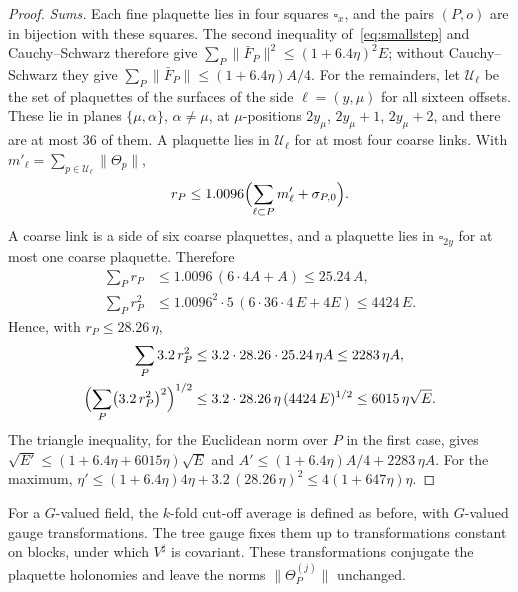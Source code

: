 \documentclass[11pt]{amsart}
\theoremstyle{definition}
\theoremstyle{remark}
\numberwithin{equation}{section}
\begin{document}
\begin{proof}
\emph{Sums.} Each fine plaquette lies in four squares $\square_x$, and the
pairs $(P,o)$ are in bijection with these squares. The second inequality
of~\eqref{eq:smallstep} and Cauchy--Schwarz therefore give $\sum_P\lVert
\bar F_P\rVert^2\le(1+6.4\eta)^2E$; without Cauchy--Schwarz they give
$\sum_P\lVert\bar F_P\rVert\le(1+6.4\eta)A/4$. For the remainders, let
$\mathcal U_\ell$ be the set of plaquettes of the surfaces of the side
$\ell=(y,\mu)$ for all sixteen offsets. These lie in planes $\{\mu,\alpha
\}$, $\alpha\ne\mu$, at $\mu$-positions $2y_\mu$, $2y_\mu+1$, $2y_\mu+2$,
and there are at most $36$ of them. A plaquette lies in $\mathcal U_\ell$
for at most four coarse links. With $m'_\ell=\sum_{p\in\mathcal U_\ell}
\lVert\Theta_p\rVert$,
\[
r_P\le1.0096\Bigl(\sum_{\ell\subset P}m'_\ell+\sigma_{P,0}\Bigr).
\]
A coarse link is a side of six coarse plaquettes, and a plaquette lies in
$\square_{2y}$ for at most one coarse plaquette. Therefore
\begin{align*}
\sum_Pr_P&\le1.0096\,(6\cdot4A+A)\le25.24\,A,\\
\sum_Pr_P^2&\le1.0096^2\cdot5\,(6\cdot36\cdot4\,E+4E)\le4424\,E.
\end{align*}
Hence, with $r_P\le28.26\,\eta$,
\begin{align*}
\sum_P3.2\,r_P^2&\le3.2\cdot28.26\cdot25.24\,\eta A\le2283\,\eta A,\\
\Bigl(\sum_P\bigl(3.2\,r_P^2\bigr)^2\Bigr)^{1/2}&\le3.2\cdot28.26\,
\eta\,(4424\,E)^{1/2}\le6015\,\eta\sqrt E .
\end{align*}
The triangle inequality, for the Euclidean norm over
$P$ in the first case, gives $\sqrt{E'}\le(1+6.4\eta+6015\eta)\sqrt E$ and
$A'\le(1+6.4\eta)A/4+2283\,\eta A$. For the maximum, $\eta'\le(1+6.4\eta)
4\eta+3.2\,(28.26\,\eta)^2\le4(1+647\eta)\eta$.
\end{proof}

For a $G$-valued field, the $k$-fold cut-off average is defined as before,
with $G$-valued gauge transformations. The tree gauge fixes them up to
transformations constant on blocks, under which $V^\sharp$ is covariant.
These transformations conjugate the plaquette holonomies and leave the
norms $\lVert\Theta^{(j)}_P\rVert$ unchanged.
\end{document}
